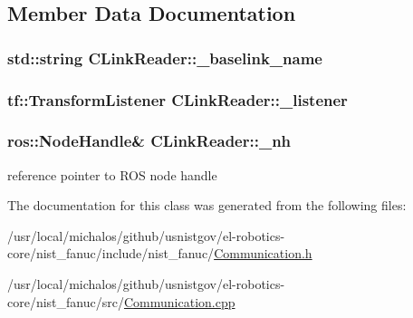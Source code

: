 \subsection{Member Data Documentation}
\hypertarget{classCLinkReader_a896e3d57e157c3bb5fdf630fbb87575d}{
\subsubsection[{\-\_\-baselink\-\_\-name}]{\setlength{\rightskip}{0pt plus 5cm}std\-::string C\-Link\-Reader\-::\-\_\-baselink\-\_\-name}}\label{classCLinkReader_a896e3d57e157c3bb5fdf630fbb87575d}
\hypertarget{classCLinkReader_a86de58d6199f63fd823067616398a7cf}{
\subsubsection[{\-\_\-listener}]{\setlength{\rightskip}{0pt plus 5cm}tf\-::\-Transform\-Listener C\-Link\-Reader\-::\-\_\-listener}}\label{classCLinkReader_a86de58d6199f63fd823067616398a7cf}
\hypertarget{classCLinkReader_acead51b4129575aefacafca5e7c81b36}{
\subsubsection[{\-\_\-nh}]{\setlength{\rightskip}{0pt plus 5cm}ros\-::\-Node\-Handle\& C\-Link\-Reader\-::\-\_\-nh}}\label{classCLinkReader_acead51b4129575aefacafca5e7c81b36}
reference pointer to R\-O\-S node handle 

The documentation for this class was generated from the following files\-:\begin{DoxyCompactItemize}
\item 
/usr/local/michalos/github/usnistgov/el-\/robotics-\/core/nist\-\_\-fanuc/include/nist\-\_\-fanuc/\hyperlink{Communication_8h}{Communication.\-h}\item 
/usr/local/michalos/github/usnistgov/el-\/robotics-\/core/nist\-\_\-fanuc/src/\hyperlink{Communication_8cpp}{Communication.\-cpp}\end{DoxyCompactItemize}
